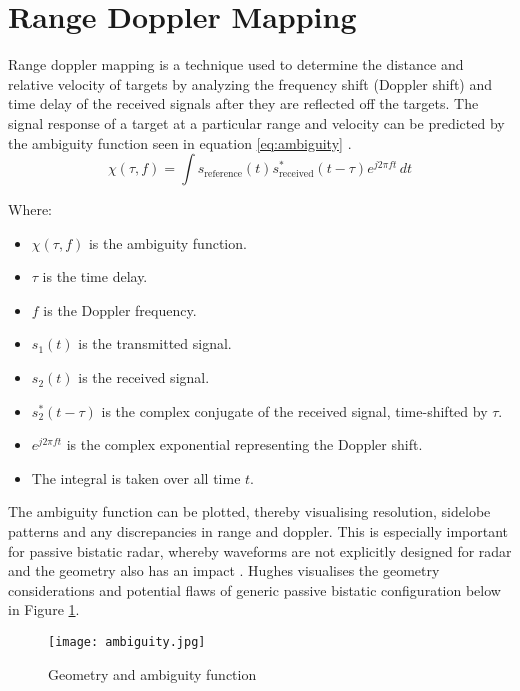 \section{Range Doppler Mapping}
Range doppler mapping is a technique used to determine the distance and relative velocity of targets by analyzing the frequency shift (Doppler shift) and time delay of the received signals after they are reflected off the targets. The signal response of a target at a particular range and velocity can be predicted by the ambiguity function seen in equation \ref*{eq:ambiguity} \cite{INTRO2017}. 
\begin{equation}
    \chi(\tau, f) = \int s_{\text{reference}}(t) s_{\text{received}}^*(t - \tau) e^{j2\pi f t} \, dt \label{eq:ambiguity}
\end{equation}

Where:
\begin{multicols}{2}
\begin{itemize}
\item \( \chi(\tau, f) \) is the ambiguity function.
\item \( \tau \) is the time delay.
\item \( f \) is the Doppler frequency.
\item \( s_1(t) \) is the transmitted signal.
\item \( s_2(t) \) is the received signal.
\item \( s_2^*(t - \tau) \) is the complex conjugate of the received signal, time-shifted by \( \tau \).
\item \( e^{j2\pi f t} \) is the complex exponential representing the Doppler shift.
\item The integral is taken over all time \( t \).
\end{itemize}
\end{multicols}

\noindent The ambiguity function can be plotted, thereby visualising resolution, sidelobe patterns and any discrepancies in range and doppler. This is especially important for passive bistatic radar, whereby waveforms are not explicitly designed for radar and the geometry also has an impact \cite{FundamentalsPassiveRadar}. Hughes visualises the geometry considerations and potential flaws of generic passive bistatic configuration below in Figure \ref{fig:ambiguity}.

\begin{figure}[htbp]
    \centering
    \texttt{[image: ambiguity.jpg]}
    \caption{Geometry and ambiguity function \cite{FundamentalsPassiveRadar}}
    \label{fig:ambiguity}
\end{figure}


